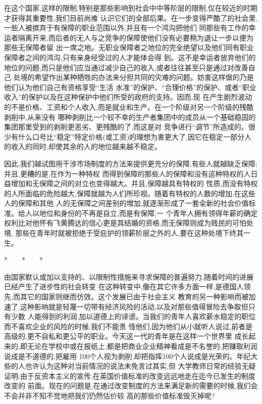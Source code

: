 ﻿\documentclass[12pt]{article}
\begin{document}
在这个国家,这样的限制,特别是那些影响到社会中中等阶层的限制,仅在较近的时期才获得其重要性,我们目前尚难
认识它们的全部后果。在一步变得严酷了的社会里,一些人被摈弃于有保障的职业范围以外,并且有一个鸿沟把他们
同那些有工作的幸运者隔离开来,而后者的无人与之竞争的保障使他们没有必要稍为退让一步以便为那些无保障者留
出一席之地。无职业保障者之地位的完全绝望以及他们同有职业保障者之间的鸿沟,只有亲身经受过的人才能体会得
到。这不是幸运者放弃他们的地位的问题,而只是他们应当通过减少自己的收入,或者往往甚至只是通过对改善自己
处境的希望作出某种牺牲的办法来分担共同的灾难的问题。妨害这样做的乃是他们认为他们自己有资格享受``生活
水准''的保护、``合理价格''的保护、或者``职业收入''的保护以及在这种保护中他们所受的政府的支持。因而,现
在产生剧烈波动的不是价格、工资和个人收入,而是就业和生产。在一个阶级对另一个阶级的残酷剥削中,从来没有
哪种剥削比一个较不幸的生产者集团中的成员从一个基础稳固的集团那里受到的剥削更恶劣、更残酷的了,而这是对
竞争进行``调节''所造成的。很少有什么口号比``稳定''特定价格(或工资)的理想为害更大了,因它在稳定一部分人
的收入的同时,却使其余的人的地位越来越不稳定。

因此,我们越试图用干涉市场制度的方法来提供更充分的保障,有些人就越缺乏保障;并且,更糟的是,在作为一种特权
而得到保障的那些人的保障和没有这种特权的人日益增加和无保障之间的对立也变得越大。并且,保障越具有特权的
性质,而没有特权的人所面临的危险越大,保障就越为人们所珍视。随着有特权的人数的增加,在这些人的保障和其他
人的无保障之间差别的增加,就逐渐形成了一套全新的社会价值标准。给人以地位和身份的不再是自立,而是有保障,一
个青年人拥有领得年薪的确定权利比对他怀有飞黄腾达的信心更是其结婚的资格,而无保障则成为贱民的可怕处境,
那些在青年时就被拒绝于受庇护的领薪阶层之外的人,要在这种处境下终其一生。

*　　*　　*

由国家默认或加以支持的、以限制性措施来寻求保障的普遍努力,随着时间的进展已经产生了进步性的社会转变
\myrule 在这种转变中,像在其它许多方面一样,是德国人领先,而其它的国家则继而仿效。这个发展已由于社会主义
教育的另一种影响而被加速了,这种影响就是轻蔑一切带有经济风险的活动,以及对那些值得冒险去争取但只有少数
人能得到的利润,加以道德上的诽谤。当我们的青年人喜欢薪水稳定的职位而不喜欢企业的风险的时候,我们不能责
怪他们,因为他们从小就听人说过,前者是高级的,更不自私和更公平的职业。今天这一代的青年是在这样一个世界里
成长起来的,即无论在学校中或在报纸上,都是把商业企业精神看成是不名誉的,把赚取利润说成是不道德的,把雇用
100个人视为剥削,却把指挥100个人说成是光荣的。年纪大些的人也许认为这种对当前情况的说法未免言过其实,但
大学教师日常的经验无疑证明:由于反资本主义的宣传,在英国价值标准的改变远远地走在迄今已发生的制度改变的
前面。现在的问题是,在通过改变制度的方法来满足新的需要的时候,我们会不会并非不知不觉地把我们仍然估价较
高的那些价值标准毁灭掉呢?
\end{document}
